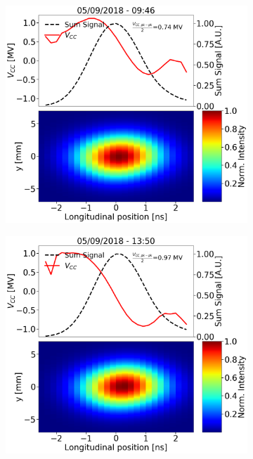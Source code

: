 \begin{figure}[!ht]
    \centering
    \begin{subfigure}[t]{0.45\textwidth}
        \centering
        \includegraphics[width=1\textwidth]{images/Ch5/HT_crabVoltage__20180905_094640_crabbing_only.png}
    \end{subfigure}
    \hfill
    \begin{subfigure}[t]{0.45\textwidth}
        \centering
        \includegraphics[width=1\textwidth]{images/Ch5/HT_crabVoltage__20180905_135033_crabbing_only.png}

\end{subfigure}
\end{figure}
